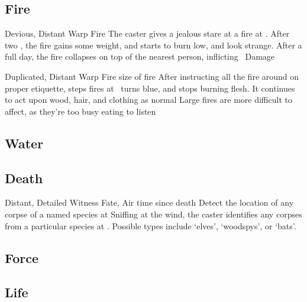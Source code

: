 \begin{multicols}{2}
\subsection{Fire}


  {Devious, Distant}%
  {Warp}%
  {Fire}%
  {}%
  {The caster gives a jealous stare at a fire at \spellRange.
  After two , the fire gains some weight, and starts to burn low, and look strange.
  After a full day, the fire collapses on top of the nearest person, inflicting \showDam~Damage}%
  {}

  {Duplicated, Distant}%
  {Warp}%
  {Fire}%
  {size of fire}%
  {After instructing all the fire around on proper etiquette,  \glspl{step} fires at \spellRange\ turns blue, and stops burning flesh.
  It continues to act upon wood, hair, and clothing as normal}%
  {Large fires are more difficult to affect, as they're too busy eating to listen}

\subsection{Water}


\subsection{Death}


  {Distant, Detailed}%
  {Witness}%
  {Fate, Air}%
  {time since death}%
  {Detect the location of any corpse of a named species at \spellRange}%
  {
    Sniffing at the wind, the caster identifies any corpses from a particular species at \spellRange.
    Possible types include `elves', `\glspl{woodspy}', or `bats'.}

\subsection{Force}


\subsection{Life}


\end{multicols}
